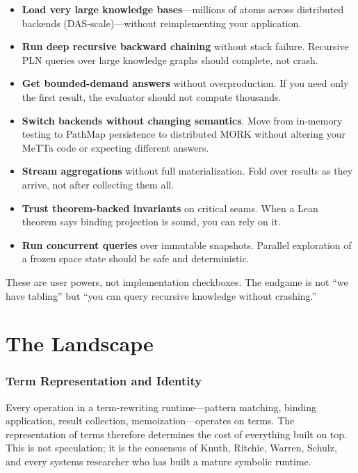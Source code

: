\documentclass[11pt]{article}
\newcommand{\PathMap}{\textup{PathMap}}
\newcommand{\MORK}{\textup{MORK}}
\begin{document}
\begin{itemize}
\item \textbf{Load very large knowledge bases}---millions of atoms across
  distributed backends (DAS-scale)---without reimplementing your application.
\item \textbf{Run deep recursive backward chaining} without stack failure.
  Recursive PLN queries over large knowledge graphs should complete, not crash.
\item \textbf{Get bounded-demand answers} without overproduction.  If you need
  only the first result, the evaluator should not compute thousands.
\item \textbf{Switch backends without changing semantics}.  Move from in-memory
  testing to \PathMap{} persistence to distributed \MORK{} without altering
  your MeTTa code or expecting different answers.
\item \textbf{Stream aggregations} without full materialization.  Fold over
  results as they arrive, not after collecting them all.
\item \textbf{Trust theorem-backed invariants} on critical seams.  When a Lean
  theorem says binding projection is sound, you can rely on it.
\item \textbf{Run concurrent queries} over immutable snapshots.  Parallel
  exploration of a frozen space state should be safe and deterministic.
\end{itemize}

These are user powers, not implementation checkboxes.  The endgame is not
``we have tabling'' but ``you can query recursive knowledge without crashing.''

\part{The Landscape}

\section{Term Representation and Identity}
\label{sec:terms}

Every operation in a term-rewriting runtime---pattern matching, binding
application, result collection, memoization---operates on terms.  The
representation of terms therefore determines the cost of everything
built on top.  This is not speculation; it is the consensus of Knuth,
Ritchie, Warren, Schulz, and every systems researcher who has built a
mature symbolic runtime.
\end{document}
